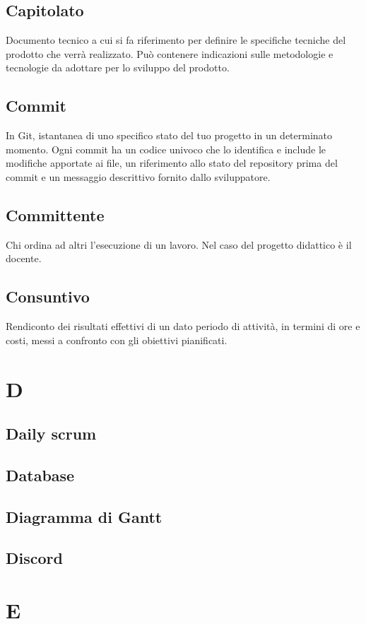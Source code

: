     \subsection{Capitolato}
    Documento tecnico a cui si fa riferimento per definire le specifiche tecniche 
    del prodotto che verrà realizzato. Può contenere indicazioni sulle metodologie e
    tecnologie da adottare per lo sviluppo del prodotto.
    \subsection{Commit}
    In Git, istantanea di uno specifico stato del tuo progetto in un determinato momento.
    Ogni commit ha un codice univoco che lo identifica e include le modifiche apportate ai file,
    un riferimento allo stato del repository prima del commit e un messaggio descrittivo fornito dallo sviluppatore.
    \subsection{Committente}
    Chi ordina ad altri l'esecuzione di un lavoro. Nel caso del progetto didattico
    è il docente.
    \subsection{Consuntivo}
    Rendiconto dei risultati effettivi di un dato periodo di attività, 
    in termini di ore e costi, messi a confronto con gli obiettivi pianificati.
\section{D}
    \subsection{Daily scrum}
    \subsection{Database}
    \subsection{Diagramma di Gantt}
    \subsection{Discord}
\section{E}
